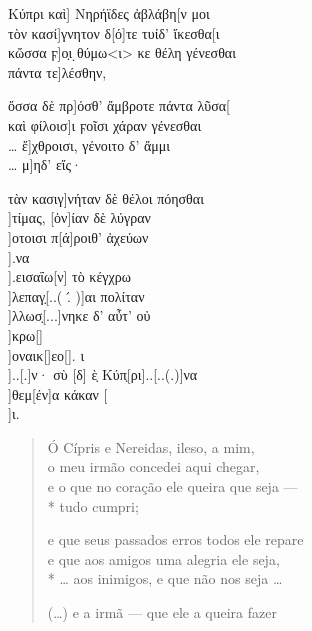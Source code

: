 \begin{gkverse}
Κύπρι καὶ] Νηρήϊδες ἀβλάβη[ν μοι\\
		τὸν κασί]γνητον δ[ό]τε τυίδ’ ἴκεσθα[ι\\
κὤσσα ϝ]ο̣ι ̣θύμω<ι> κε θέλη γένεσθαι\\
πάντα τε]λέσθην,

ὄσσα δὲ πρ]όσθ’ ἄμβροτε πάντα λῦσα[\\
καὶ φίλοισ]ι ϝοῖσι χάραν γένεσθαι\\
\ldots{} ἔ]χθροισι, γένοιτο δ’ ἄμμι\\
\ldots{} μ]ηδ’ εἴς·

τὰν κασιγ]νήταν δὲ θέλοι πόησθαι\\
 ]τίμας, [ὀν]ίαν δὲ λύγραν\\
 ]οτοισι π[ά]ροιθ’ ἀχεύων\\
 ].να\\
 ].εισαΐω[ν] τὸ κέγχρω\\
  ]λεπαγ̣[..( .́ )]αι πολίταν\\
  ]λλωσ̣[...]νηκε δ’ αὖτ’ οὐ\\
 ]κρω[]\\
 ]οναικ[\quad]εο[\quad]. ι\\
 ]..[.]ν· σὺ [δ] ὲ̣ Κύπ̣[ρι]..[..(.)]να\\
       ]θεμ[έν]α κάκαν [\\
	       ]ι.	
\end{gkverse}

\begin{verse}
Ó Cípris e Nereidas, ileso, a mim,\\
o meu irmão concedei aqui chegar,\\
e o que no coração ele queira que seja ---\\*
tudo cumpri;

e que seus passados erros todos ele repare\\
e que aos amigos uma alegria ele seja,\\*
\ldots{} aos inimigos, e que não nos seja \ldots{}

(\ldots{}) e a irmã --- que ele a queira fazer
\end{verse}

